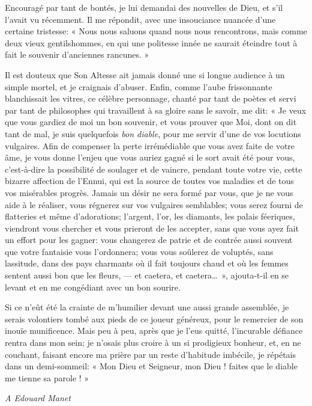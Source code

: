 Encouragé par tant de bontés, je lui demandai des nouvelles de Dieu, et
s’il l’avait vu récemment. Il me
répondit, avec une insouciance nuancée d’une certaine
tristesse: « Nous nous saluons quand nous nous rencontrons, mais comme
deux vieux gentilshommes, en qui une politesse innée ne saurait
éteindre tout à fait le souvenir d’anciennes rancunes.
»

Il est douteux que Son Altesse ait jamais donné une si longue audience à
un simple mortel, et je craignais d’abuser. Enfin,
comme l’aube frissonnante blanchissait les vitres, ce
célèbre personnage, chanté par tant de poètes et servi par tant de
philosophes qui travaillent à sa gloire sans le savoir, me dit: « Je
veux que vous gardiez de moi un bon souvenir, et vous prouver que Moi,
dont on dit tant de mal, je suis quelquefois \textit{bon diable}, pour me servir
d’une de vos locutions vulgaires. Afin de compenser la
perte irrémédiable que vous avez faite de votre âme, je vous donne
l’enjeu que vous auriez gagné si le sort avait été
pour vous, c’est{}-à{}-dire la possibilité de soulager
et de vaincre, pendant toute votre vie, cette bizarre affection de
l’Ennui, qui est la source de toutes vos maladies et
de tous vos misérables progrès. Jamais un désir ne sera formé par vous,
que je ne vous aide à le réaliser, vous régnerez sur vos vulgaires
semblables; vous serez fourni de flatteries et même
d’adorations; l’argent,
l’or, les diamants, les palais féeriques, viendront
vous chercher et vous prieront de les accepter, sans que vous ayez fait
un effort pour les gagner: vous changerez de patrie et de contrée aussi
souvent que votre fantaisie vous l’ordonnera; vous
vous soûlerez de voluptés, sans lassitude, dans des pays charmants où
il fait toujours chaud et où les femmes sentent aussi bon que les
fleurs, --- et caetera, et caetera\ldots\ », ajouta{}-t{}-il en se levant et
en me congédiant avec un bon sourire.

Si ce n’eût été la crainte de
m’humilier devant une aussi grande assemblée, je
serais volontiers tombé aux pieds de ce joueur généreux, pour le
remercier de son inouïe munificence. Mais peu à peu, après que je
l’eus quitté, l’incurable défiance
rentra dans mon sein; je n’osais plus croire à un si
prodigieux bonheur, et, en ne couchant, faisant encore ma prière par un
reste d’habitude imbécile, je répétais dans un
demi{}-sommeil: « Mon Dieu et Seigneur, mon Dieu ! faites que le diable
me tienne sa parole ! »


\begin{flushright}
\textit{A Edouard Manet}
\end{flushright}

